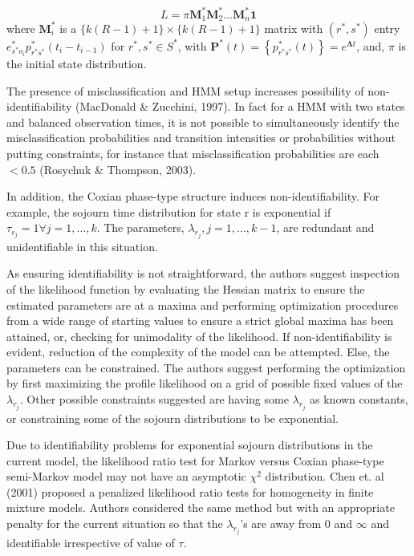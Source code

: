 \documentclass{uwstat572}
\begin{document}
\begin{equation}\label{eqn:likelihood}
L=\pi \bm{M}_1^* \bm{M}_2^* \ldots \bm{M}_{n}^* \bm{1}
\end{equation}
where $\bm{M}_i^*$ is a $\{k(R-1) +1\} \times \{k(R-1) +1\}$ matrix with $(r^*,s^*)$ entry $e^*_{s^* o_i} p^*_{r^* s^*} (t_i - t_{i-1})$ for $r^*, s^* \in S^*$, with $\mathbf{P}^*(t)=\left\{p^*_{r^* s^*}(t)\right\} = e^{\bm{\Lambda}t}$,  and, $\pi$ is the initial state distribution.

The presence of misclassification and HMM setup increases possibility of non-identifiability (MacDonald \& Zucchini, 1997). In fact for a HMM with two states and balanced observation times, it is not possible to simultaneously identify the misclassification probabilities and transition intensities or probabilities without putting constraints, for instance that misclassification probabilities are each $<0.5$ (Rosychuk \& Thompson, 2003).

In addition, the Coxian phase-type structure induces non-identifiability. For example, the sojourn time distribution for state r is exponential if $\tau_{r_j} = 1 \forall j = 1,\ldots , k$. The parameters, $\lambda_{r_j}, j = 1,...,k - 1$, are redundant and unidentifiable in this situation.

As ensuring identifiability is not straightforward, the authors suggest inspection of the likelihood function by evaluating the Hessian matrix to ensure the estimated parameters are at a maxima and performing optimization procedures from a wide range of starting values to ensure a strict global maxima has been attained, or, checking for unimodality of the likelihood. If non-identifiability is evident, reduction of the complexity of the model can be attempted. Else, the parameters can be constrained. The authors suggest performing the optimization by first maximizing the profile likelihood on a grid of possible fixed values of the $\lambda_{r_j}$. Other possible constraints suggested are having some $\lambda_{r_j}$ as known constants, or constraining some of the sojourn distributions to be exponential.

Due to identifiability problems for exponential sojourn distributions in the current model, the likelihood ratio test for Markov versus Coxian phase-type semi-Markov model may not have an asymptotic $\chi^2$ distribution. Chen et. al (2001) proposed a penalized likelihood ratio tests for homogeneity in finite mixture models. Authors considered the same method but with an appropriate penalty for the current situation so that the $\lambda_{r_j}$'s are away from $0$ and $\infty$ and identifiable irrespective of value of $\tau$.
\end{document}
